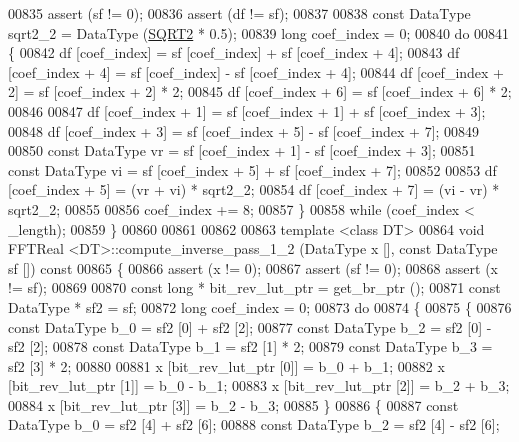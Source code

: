\begin{DoxyCode}
00835     assert (sf != 0);
00836     assert (df != sf);
00837 
00838     \textcolor{keyword}{const} DataType  sqrt2\_2 = DataType (\hyperlink{a00142_a489004390ad7d791bf53a724c0f07abb}{SQRT2} * 0.5);
00839     \textcolor{keywordtype}{long}                coef\_index = 0;
00840     \textcolor{keywordflow}{do}
00841     \{
00842         df [coef\_index] = sf [coef\_index] + sf [coef\_index + 4];
00843         df [coef\_index + 4] = sf [coef\_index] - sf [coef\_index + 4];
00844         df [coef\_index + 2] = sf [coef\_index + 2] * 2;
00845         df [coef\_index + 6] = sf [coef\_index + 6] * 2;
00846 
00847         df [coef\_index + 1] = sf [coef\_index + 1] + sf [coef\_index + 3];
00848         df [coef\_index + 3] = sf [coef\_index + 5] - sf [coef\_index + 7];
00849 
00850         \textcolor{keyword}{const} DataType  vr = sf [coef\_index + 1] - sf [coef\_index + 3];
00851         \textcolor{keyword}{const} DataType  vi = sf [coef\_index + 5] + sf [coef\_index + 7];
00852 
00853         df [coef\_index + 5] = (vr + vi) * sqrt2\_2;
00854         df [coef\_index + 7] = (vi - vr) * sqrt2\_2;
00855 
00856         coef\_index += 8;
00857     \}
00858     \textcolor{keywordflow}{while} (coef\_index < \_length);
00859 \}
00860 
00861 
00862 
00863 \textcolor{keyword}{template} <\textcolor{keyword}{class} DT>
00864 \textcolor{keywordtype}{void}    FFTReal <DT>::compute\_inverse\_pass\_1\_2 (DataType x [], \textcolor{keyword}{const} DataType sf []) \textcolor{keyword}{const}
00865 \{
00866     assert (x != 0);
00867     assert (sf != 0);
00868     assert (x != sf);
00869 
00870     \textcolor{keyword}{const} \textcolor{keywordtype}{long} *    bit\_rev\_lut\_ptr = get\_br\_ptr ();
00871     \textcolor{keyword}{const} DataType *    sf2 = sf;
00872     \textcolor{keywordtype}{long}                coef\_index = 0;
00873     \textcolor{keywordflow}{do}
00874     \{
00875         \{
00876             \textcolor{keyword}{const} DataType  b\_0 = sf2 [0] + sf2 [2];
00877             \textcolor{keyword}{const} DataType  b\_2 = sf2 [0] - sf2 [2];
00878             \textcolor{keyword}{const} DataType  b\_1 = sf2 [1] * 2;
00879             \textcolor{keyword}{const} DataType  b\_3 = sf2 [3] * 2;
00880 
00881             x [bit\_rev\_lut\_ptr [0]] = b\_0 + b\_1;
00882             x [bit\_rev\_lut\_ptr [1]] = b\_0 - b\_1;
00883             x [bit\_rev\_lut\_ptr [2]] = b\_2 + b\_3;
00884             x [bit\_rev\_lut\_ptr [3]] = b\_2 - b\_3;
00885         \}
00886         \{
00887             \textcolor{keyword}{const} DataType  b\_0 = sf2 [4] + sf2 [6];
00888             \textcolor{keyword}{const} DataType  b\_2 = sf2 [4] - sf2 [6];

\end{DoxyCode}
